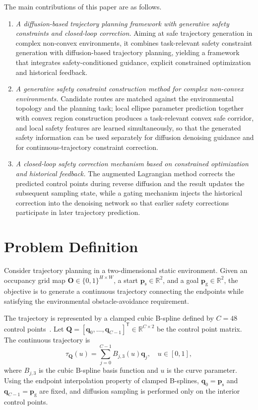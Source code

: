 \documentclass[journal]{IEEEtran}
\begin{document}
The main contributions of this paper are as follows.
\begin{enumerate}
\item \emph{A diffusion-based trajectory planning framework with generative
safety constraints and closed-loop correction.} Aiming at safe trajectory
generation in complex non-convex environments, it combines task-relevant safety
constraint generation with diffusion-based trajectory planning, yielding a
framework that integrates safety-conditioned guidance, explicit constrained
optimization and historical feedback.

\item \emph{A generative safety constraint construction method for complex
non-convex environments.} Candidate routes are matched against the
environmental topology and the planning task; local ellipse parameter
prediction together with convex region construction produces a task-relevant
convex safe corridor, and local safety features are learned simultaneously, so
that the generated safety information can be used separately for diffusion
denoising guidance and for continuous-trajectory constraint correction.

\item \emph{A closed-loop safety correction mechanism based on constrained
optimization and historical feedback.} The augmented Lagrangian method corrects
the predicted control points during reverse diffusion and the result updates
the subsequent sampling state, while a gating mechanism injects the historical
correction into the denoising network so that earlier safety corrections
participate in later trajectory prediction.
\end{enumerate}

\section{Problem Definition}
Consider trajectory planning in a two-dimensional static environment. Given an
occupancy grid map $\mathbf O\in\{0,1\}^{H\times W}$, a start
$\mathbf p_{\mathrm s}\in\mathbb R^2$, and a goal $\mathbf p_{\mathrm g}\in\mathbb R^2$,
the objective is to generate a continuous trajectory connecting the endpoints
while satisfying the environmental obstacle-avoidance requirement.

The trajectory is represented by a clamped cubic B-spline defined by $C=48$
control points~\cite{nurbs,fast,ego}. Let
$\mathbf Q=[\mathbf q_0,\ldots,\mathbf q_{C-1}]^{\mathsf T}\in\mathbb R^{C\times2}$
be the control point matrix. The continuous trajectory is
\begin{equation}
\tau_{\mathbf Q}(u)=\sum_{j=0}^{C-1}B_{j,3}(u)\mathbf q_j,\quad u\in[0,1],
\end{equation}
where $B_{j,3}$ is the cubic B-spline basis function and $u$ is the curve
parameter. Using the endpoint interpolation property of clamped B-splines,
$\mathbf q_0=\mathbf p_{\mathrm s}$ and $\mathbf q_{C-1}=\mathbf p_{\mathrm g}$ are
fixed, and diffusion sampling is performed only on the interior control points.
\end{document}
